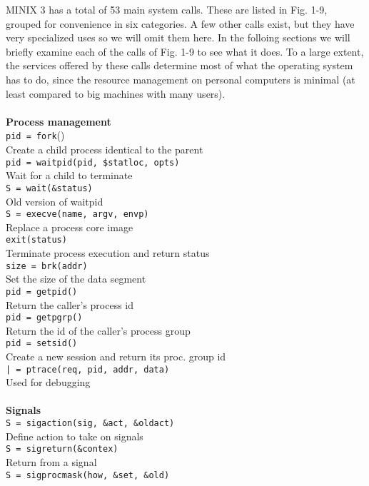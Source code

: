 \documentclass{book}
\newcommand {\kw}  [1] {\textbf{#1}}
\newcommand {\cmd} [1] {\texttt{#1}}
\begin{document}
MINIX 3 has a total of 53 main system calls.
These are listed in Fig. 1-9, grouped for convenience in six categories.
A few other calls exist, but they have very specialized uses so we will omit them here.
In the folloing sections we will briefly examine each of the calls of Fig. 1-9 to see what it does.
To a large extent, the services offered by these calls determine most of what the operating system has to do, 
since the resource management on personal computers is minimal (at least compared to big machines with many users).
\\
\\
\kw{Process management}\\
\cmd{pid = fork}()\\
Create a child process identical to the parent
\\
\cmd{pid = waitpid(pid, \$statloc, opts)}\\
Wait for a child to terminate
\\
\cmd{S = wait(\&status)}\\
Old version of waitpid
\\
\cmd{S = execve(name, argv, envp)}\\
Replace a process core image
\\
\cmd{exit(status)}\\
Terminate process execution and return status
\\
\cmd{size = brk(addr)}\\
Set the size of the data segment
\\
\cmd{pid = getpid()}\\
Return the caller's process id
\\
\cmd{pid = getpgrp()}\\
Return the id of the caller's process group
\\
\cmd{pid = setsid()}\\
Create a new session and return its proc. group id
\\
\cmd{| = ptrace(req, pid, addr, data)}\\
Used for debugging
\\
\\
\kw{Signals}\\
\cmd{S = sigaction(sig, \&act, \&oldact)}\\
Define action to take on signals
\\
\cmd{S = sigreturn(\&contex)}\\
Return from a signal
\\
\cmd{S = sigprocmask(how, \&set, \&old)}\\
\end{document}
